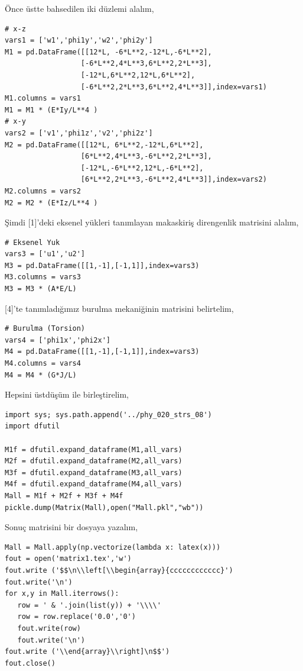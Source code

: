 \documentclass[12pt,fleqn]{article}\usepackage{../../common}
\begin{document}
Önce üstte bahsedilen iki düzlemi alalım,

\begin{verbatim}
# x-z
vars1 = ['w1','phi1y','w2','phi2y']
M1 = pd.DataFrame([[12*L, -6*L**2,-12*L,-6*L**2],
                  [-6*L**2,4*L**3,6*L**2,2*L**3],
                  [-12*L,6*L**2,12*L,6*L**2],
                  [-6*L**2,2*L**3,6*L**2,4*L**3]],index=vars1)
M1.columns = vars1
M1 = M1 * (E*Iy/L**4 )
# x-y
vars2 = ['v1','phi1z','v2','phi2z']
M2 = pd.DataFrame([[12*L, 6*L**2,-12*L,6*L**2],
                  [6*L**2,4*L**3,-6*L**2,2*L**3],
                  [-12*L,-6*L**2,12*L,-6*L**2],
                  [6*L**2,2*L**3,-6*L**2,4*L**3]],index=vars2)
M2.columns = vars2
M2 = M2 * (E*Iz/L**4 )
\end{verbatim}

Şimdi [1]'deki eksenel yükleri tanımlayan makaskiriş direngenlik matrisini
alalım,

\begin{verbatim}
# Eksenel Yuk
vars3 = ['u1','u2']
M3 = pd.DataFrame([[1,-1],[-1,1]],index=vars3)
M3.columns = vars3
M3 = M3 * (A*E/L)
\end{verbatim}

[4]'te tanımladığımız burulma mekaniğinin matrisini belirtelim,

\begin{verbatim}
# Burulma (Torsion)
vars4 = ['phi1x','phi2x']
M4 = pd.DataFrame([[1,-1],[-1,1]],index=vars3)
M4.columns = vars4
M4 = M4 * (G*J/L)
\end{verbatim}

Hepsini üstdüşüm ile birleştirelim,

\begin{verbatim}
import sys; sys.path.append('../phy_020_strs_08')
import dfutil

M1f = dfutil.expand_dataframe(M1,all_vars)
M2f = dfutil.expand_dataframe(M2,all_vars)
M3f = dfutil.expand_dataframe(M3,all_vars)
M4f = dfutil.expand_dataframe(M4,all_vars)
Mall = M1f + M2f + M3f + M4f
pickle.dump(Matrix(Mall),open("Mall.pkl","wb"))
\end{verbatim}

Sonuç matrisini bir dosyaya yazalım, 

\begin{verbatim}
Mall = Mall.apply(np.vectorize(lambda x: latex(x)))
fout = open('matrix1.tex','w')
fout.write ('$$\n\\left[\\begin{array}{cccccccccccc}')
fout.write('\n')
for x,y in Mall.iterrows():
   row = ' & '.join(list(y)) + '\\\\'
   row = row.replace('0.0','0')
   fout.write(row)
   fout.write('\n')
fout.write ('\\end{array}\\right]\n$$')
fout.close()
\end{verbatim}
\end{document}
